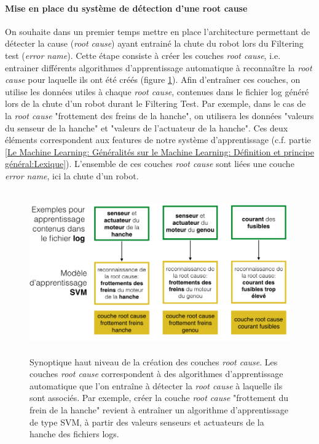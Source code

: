 \paragraph{Mise en place du système de détection d'une root cause}
On souhaite dans un premier temps mettre en place l'architecture permettant de détecter la cause (\emph{root cause}) ayant entrainé la chute du robot lors du Filtering test (\emph{error name}). Cette étape consiste à créer les couches \emph{root cause}, i.e. entrainer différents algorithmes d'apprentissage automatique à reconnaître la \emph{root cause} pour laquelle ils ont été créés (figure \ref{fig:Creation des couches root cause}). Afin d'entraîner ces couches, on utilise les données utiles à chaque \emph{root cause}, contenues dans le fichier log généré lors de la chute d'un robot durant le Filtering Test. Par exemple, dans le cas de la \emph{root cause} "frottement des freins de la hanche", on utilisera les données "valeurs du senseur de la hanche" et "valeurs de l'actuateur de la hanche". Ces deux éléments correspondent aux features de notre système d'apprentissage (c.f. partie \ref{Le Machine Learning: Généralités sur le Machine Learning: Définition et principe général:Lexique}). L'ensemble de ces couches \emph{root cause} sont liées une couche \emph{error name}, ici la chute d'un robot.

\begin{figure}[h]
	\centering\includegraphics[height=7cm]{images/synoptique_root.png}
	\caption[Création des couches root cause]{Synoptique haut niveau de la création des couches \emph{root cause}. Les couches \emph{root cause} correspondent à des algorithmes d'apprentissage automatique que l'on entraîne à détecter la \emph{root cause} à laquelle ils sont associés. Par exemple, créer la couche \emph{root cause} "frottement du frein de la hanche" revient à entraîner un algorithme d'apprentissage de type SVM, à partir des valeurs senseurs et actuateurs de la hanche des fichiers logs.}
	\label{fig:Creation des couches root cause}
\end{figure}

